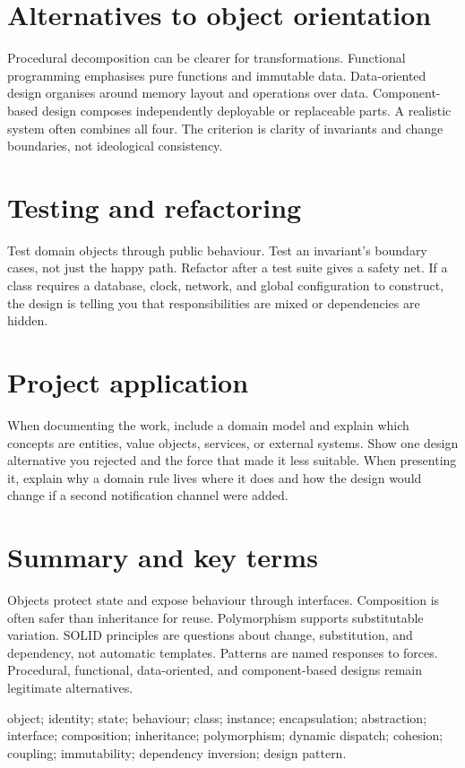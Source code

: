 \section{Alternatives to object orientation}
Procedural decomposition can be clearer for transformations. Functional programming emphasises pure functions and immutable data. Data-oriented design organises around memory layout and operations over data. Component-based design composes independently deployable or replaceable parts. A realistic system often combines all four. The criterion is clarity of invariants and change boundaries, not ideological consistency.

\section{Testing and refactoring}
Test domain objects through public behaviour. Test an invariant's boundary cases, not just the happy path. Refactor after a test suite gives a safety net. If a class requires a database, clock, network, and global configuration to construct, the design is telling you that responsibilities are mixed or dependencies are hidden.

\section{Project application}
When documenting the work, include a domain model and explain which concepts are entities, value objects, services, or external systems. Show one design alternative you rejected and the force that made it less suitable. When presenting it, explain why a domain rule lives where it does and how the design would change if a second notification channel were added.

\section{Summary and key terms}
Objects protect state and expose behaviour through interfaces. Composition is often safer than inheritance for reuse. Polymorphism supports substitutable variation. SOLID principles are questions about change, substitution, and dependency, not automatic templates. Patterns are named responses to forces. Procedural, functional, data-oriented, and component-based designs remain legitimate alternatives.

\begin{keyterms}object; identity; state; behaviour; class; instance; encapsulation; abstraction; interface; composition; inheritance; polymorphism; dynamic dispatch; cohesion; coupling; immutability; dependency inversion; design pattern.\end{keyterms}

